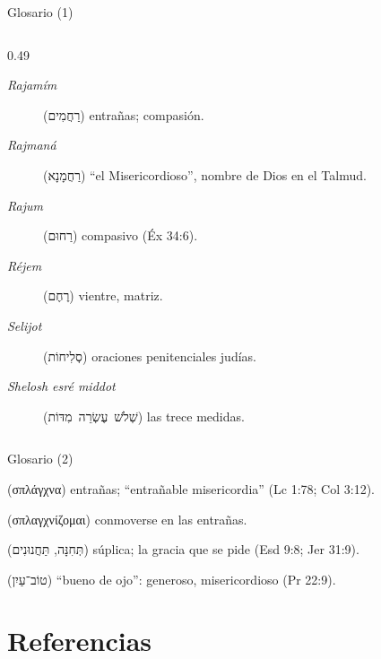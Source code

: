 \documentclass[hyperref={bookmarks=false},aspectratio=169]{beamer}
\newcommand{\heb}[1]{\mbox{\foreignlanguage{hebrew}{#1}}}
\newcommand{\grc}[1]{\foreignlanguage{ancientgreek}{#1}}
\begin{document}
\begin{frame}{Glosario (1)}
\begin{columns}[t,onlytextwidth]
\begin{column}{0.49\textwidth}
\begin{description}
\item[\emph{Rajamím}] (\heb{רַחֲמִים}) entrañas; compasión.
\item[\emph{Rajmaná}] (\heb{רַחֲמָנָא}) ``el Misericordioso'', nombre de Dios en el Talmud.
\item[\emph{Rajum}] (\heb{רַחוּם}) compasivo (Éx 34:6).
\item[\emph{Réjem}] (\heb{רֶחֶם}) vientre, matriz.
\item[\emph{Selijot}] (\heb{סְלִיחוֹת}) oraciones penitenciales judías.
\item[\emph{Shelosh esré middot}] (\heb{שְׁלֹשׁ עֶשְׂרֵה מִדּוֹת}) las trece medidas.
\end{description}
\end{column}
\end{columns}
\end{frame}

\begin{frame}{Glosario (2)}
\scriptsize
\begin{description}\setlength{\itemsep}{1pt}
\item[\emph{Splánjna}] (\grc{σπλάγχνα}) entrañas; ``entrañable misericordia'' (Lc 1:78; Col 3:12).
\item[\emph{Splanjnízomai}] (\grc{σπλαγχνίζομαι}) conmoverse en las entrañas.
\item[\emph{Tejinná}, \emph{tajanunim}] (\heb{תְּחִנָּה}, \heb{תַּחֲנוּנִים}) súplica; la gracia que se pide (Esd 9:8; Jer 31:9).
\item[\emph{Tov ayin}] (\heb{טוֹב־עַיִן}) ``bueno de ojo'': generoso, misericordioso (Pr 22:9).
\end{description}
\end{frame}

\section{Referencias}
\end{document}

